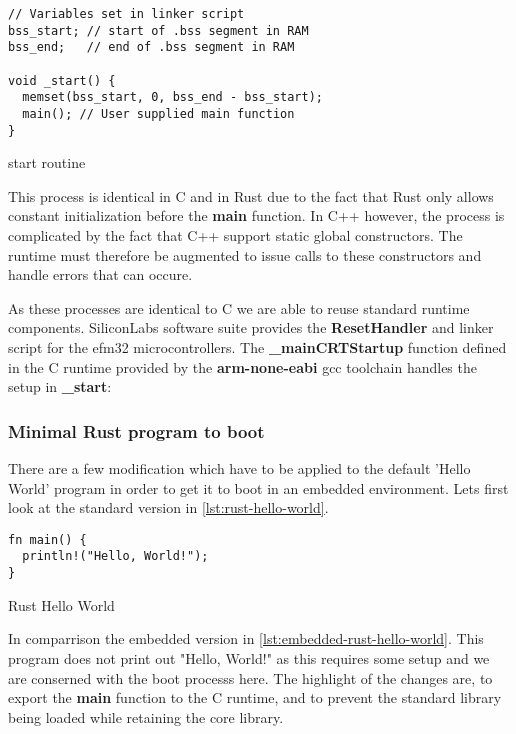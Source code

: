 \begin{listing}[H]
\begin{verbatim}
// Variables set in linker script
bss_start; // start of .bss segment in RAM
bss_end;   // end of .bss segment in RAM

void _start() {
  memset(bss_start, 0, bss_end - bss_start);
  main(); // User supplied main function
}
\end{verbatim}
\caption{start routine}
\label{lst:start}
\end{listing}

This process is identical in C and in Rust due to the fact that Rust only allows constant initialization before the \textbf{main} function.
In C++ however, the process is complicated by the fact that C++ support static global constructors.
The runtime must therefore be augmented to issue calls to these constructors and handle errors that can occure.

As these processes are identical to C we are able to reuse standard runtime components.
SiliconLabs software suite provides the \textbf{ResetHandler} and linker script for the efm32 microcontrollers.
The \textbf{\_mainCRTStartup} function defined in the C runtime provided by the \textbf{arm-none-eabi} gcc toolchain handles the setup in \textbf{\_start}:

\subsubsection{Minimal Rust program to boot}

There are a few modification which have to be applied to the default 'Hello World' program in order to get it to boot in an embedded environment.
Lets first look at the standard version in \autoref{lst:rust-hello-world}.

\begin{listing}[H]
\begin{verbatim}
fn main() {
  println!("Hello, World!");
}
\end{verbatim}
\label{lst:rust-hello-world}
\caption{Rust Hello World}
\end{listing}

In comparrison the embedded version in \autoref{lst:embedded-rust-hello-world}.
This program does not print out "Hello, World!" as this requires some setup and we are conserned with the boot processs here.
The highlight of the changes are, to export the \textbf{main} function to the C runtime, and to prevent the standard library being loaded while retaining the core library.


